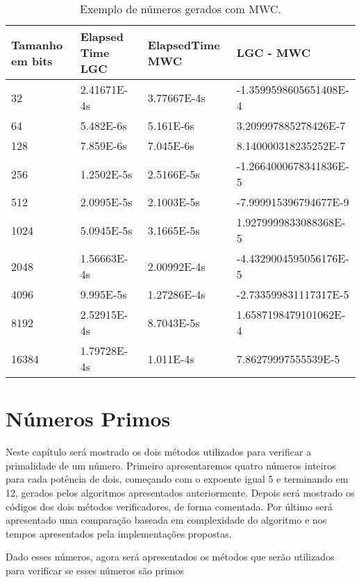 \documentclass[openany]{ufsctex/ufsctex}
\begin{document}
\begin{longtable}{| p{2cm} | p{2cm}| p{2cm}| p{4cm} |}
 \caption{Exemplo de números gerados com MWC.}\label{tab:comparacaoMWCLGC}\\
\hline
Tamanho em bits & Elapsed Time LGC & ElapsedTime MWC & LGC - MWC \\
\hline
32 & 2.41671E-4s & 3.77667E-4s & -1.3599598605651408E-4\\  
\hline
64 & 5.482E-6s & 5.161E-6s & 3.209997885278426E-7\\  
\hline
128 & 7.859E-6s & 7.045E-6s & 8.140000318235252E-7\\  
\hline
256 & 1.2502E-5s & 2.5166E-5s & -1.2664000678341836E-5\\  
\hline
512 & 2.0995E-5s & 2.1003E-5s & -7.999915396794677E-9\\  
\hline
1024 & 5.0945E-5s & 3.1665E-5s & 1.9279999833088368E-5\\  
\hline
2048 & 1.56663E-4s & 2.00992E-4s & -4.4329004595056176E-5\\  
\hline
4096 & 9.995E-5s & 1.27286E-4s & -2.733599831117317E-5\\  
\hline
8192 & 2.52915E-4s & 8.7043E-5s & 1.6587198479101062E-4\\  
\hline
16384 & 1.79728E-4s & 1.011E-4s & 7.86279997555539E-5\\  
\hline
\end{longtable}

\chapter{Números Primos}
	Neste capítulo será mostrado os dois métodos utilizados para verificar a primalidade de um número. Primeiro apresentaremos quatro números inteiros para cada potência de dois, começando com o expoente igual 5 e terminando em 12, gerados pelos algoritmos apresentados anteriormente. Depois será mostrado os códigos dos dois métodos verificadores, de forma comentada. Por último será apresentado uma comparação baseada em complexidade do algoritmo e nos tempos apresentados pela implementações propostas.
		

Dado esses números, agora será apresentados os métodos que serão utilizados para verificar se esses números são primos
\end{document}

